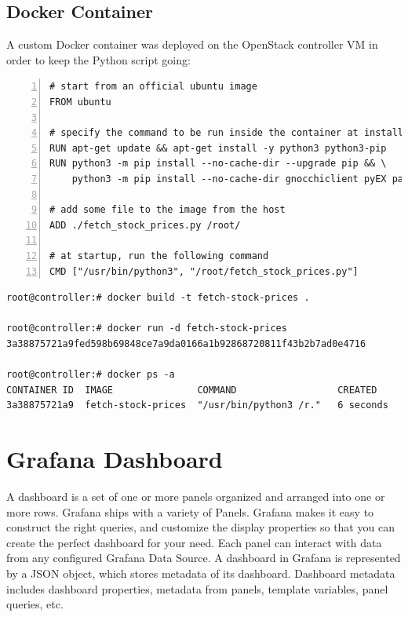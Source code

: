 \documentclass[11pt,a4paper]{article}
\begin{document}
\subsection{Docker Container}
A custom Docker container was deployed on the OpenStack controller VM in order to keep the Python script going:
\begin{lstlisting}[numbers=left, caption={Dockerfile}]
# start from an official ubuntu image
FROM ubuntu

# specify the command to be run inside the container at installation
RUN apt-get update && apt-get install -y python3 python3-pip
RUN python3 -m pip install --no-cache-dir --upgrade pip && \
    python3 -m pip install --no-cache-dir gnocchiclient pyEX pandas

# add some file to the image from the host
ADD ./fetch_stock_prices.py /root/

# at startup, run the following command
CMD ["/usr/bin/python3", "/root/fetch_stock_prices.py"]
\end{lstlisting}
\begin{lstlisting}[]
root@controller:# docker build -t fetch-stock-prices .

root@controller:# docker run -d fetch-stock-prices
3a38875721a9fed598b69848ce7a9da0166a1b92868720811f43b2b7ad0e4716

root@controller:# docker ps -a
CONTAINER ID  IMAGE               COMMAND                  CREATED
3a38875721a9  fetch-stock-prices  "/usr/bin/python3 /r."   6 seconds
\end{lstlisting}
\section{Grafana Dashboard}
A dashboard is a set of one or more panels organized and arranged into one or more rows. Grafana ships with a variety of Panels. Grafana makes it easy to construct the right queries, and customize the display properties so that you can create the perfect dashboard for your need. Each panel can interact with data from any configured Grafana Data Source. A dashboard in Grafana is represented by a JSON object, which stores metadata of its dashboard. Dashboard metadata includes dashboard properties, metadata from panels, template variables, panel queries, etc.
\end{document}
